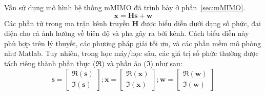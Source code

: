 Vẫn sử dụng mô hình hệ thống mMIMO đã trình bày ở phần~\ref{sec:mMIMO}.
\begin{equation}
    \mathbf{x} = \mathbf{H} \mathbf{s} + \mathbf{w}
\end{equation}
Các phần tử trong ma trận kênh truyền $\mathbf{H}$ được biểu diễn dưới dạng số phức, đại diện cho cả ảnh hưởng về biên độ và pha gây ra bởi kênh. Cách biểu diễn này phù hợp trên lý thuyết, các phương pháp giải tối ưu, và các phần mềm mô phỏng như Matlab. Tuy nhiên, trong học máy/học sâu, các giá trị số phức thường được tách riêng thành phần thực ($\Re$) và phần ảo ($\Im$) như sau:
\begin{equation}
\label{eq:matrixtras1}
    \mathbf{s}=\left[\begin{array}{l}
    \Re(\mathbf{s}) \\
    \Im(\mathbf{s})
    \end{array}\right] ;
    \mathbf{x}=\left[\begin{array}{l}
    \Re(\mathbf{x}) \\
    \Im(\mathbf{x})
    \end{array}\right] ; 
    \mathbf{w}=\left[\begin{array}{l}
    \Re(\mathbf{w}) \\
    \Im(\mathbf{w})
    \end{array}\right]
\end{equation}

